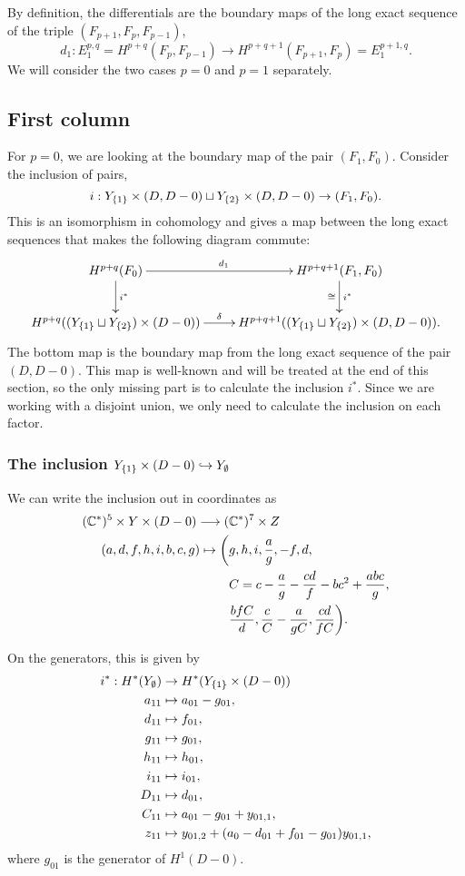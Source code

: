 By definition, the differentials are the boundary maps of the long
exact sequence of the triple $(F_{p+1},F_p,F_{p-1})$,
\[ d_1 : E_1^{p,q} = H^{p+q}(F_p,F_{p-1}) \to H^{p+q+1}(F_{p+1},F_p) =
E_1^{p+1,q}. \]
We will consider the two cases $p=0$ and $p=1$ separately.

\subsection{First column}

For $p = 0$, we are looking at the boundary map of the pair
$(F_1,F_0)$. Consider the inclusion of pairs,
\[ i : Y_{\left\{ 1 \right\}}\times (D,D-0) \sqcup Y_{\left\{ 2 \right\}}\times (D,D-0) \to
(F_1,F_0). \]
This is an isomorphism in cohomology and gives a map between the long
exact sequences that makes the following diagram
commute:
\[ \xymatrix{
H^{p+q}(F_0) \ar[r]^>>>>>>>>>>>>>>>>>>>{d_1} \ar[d]^-{i^*} &
H^{p+q+1}(F_1,F_0) \ar[d]^-{i^*}_-{\cong} \\
H^{p+q}((Y_{\set{1}}\sqcup Y_{\set{2}})\times (D-0))
\ar[r]^>>>>>{\delta} & H^{p+q+1}((Y_{\set{1}}\sqcup Y_{\set{2}})\times
(D,D-0)). } \]
The bottom map is the boundary map from the long exact sequence of the
pair $(D,D-0)$. This map is well-known and will be treated at the end
of this section, so the only missing part is to calculate the
inclusion $i^*$. Since we are working with a disjoint union, we only
need to calculate the inclusion on each factor.

\subsubsection{The inclusion $Y_{\left\{ 1 \right\}}\times (D-0) 
  \hookrightarrow Y_\emptyset$}

We can write the inclusion out in coordinates as
\begin{align*}
  (\mathbb{C}^*)^5\times Y \times (D-0) \longrightarrow
  (&\mathbb{C}^*)^7\times Z \\
  (a,d,f,h,i,b,c,g) \mapsto \bigg(&g,h,i,\frac{a}{g},-f,d,\\
  & C =
  c-\frac{a}{g}-\frac{cd}{f}-bc^2+\frac{abc}{g}, \\
  & \frac{bfC}{d},\frac{c}{C}-\frac{a}{g C},\frac{cd}{fC}\bigg).
\end{align*}

On the generators, this is given by
\begin{align*}
  i^* : H^*(Y_{\emptyset}) &\to H^*(Y_{\left\{ 1 \right\}}\times (D-0)) \\
  a_{11} & \mapsto a_{01} - g_{01}, \\
  d_{11} &\mapsto f_{01}, \\
  g_{11} &\mapsto g_{01}, \\
  h_{11} &\mapsto h_{01}, \\
  i_{11} &\mapsto i_{01}, \\
  D_{11} &\mapsto d_{01}, \\
  C_{11} &\mapsto a_{01} - g_{01} + y_{01,1}, \\
  z_{11} &\mapsto y_{01,2} + (a_{0}-d_{01}+f_{01}-g_{01})y_{01,1},
\end{align*}
where $g_{01}$ is the generator of $H^1(D-0)$.


